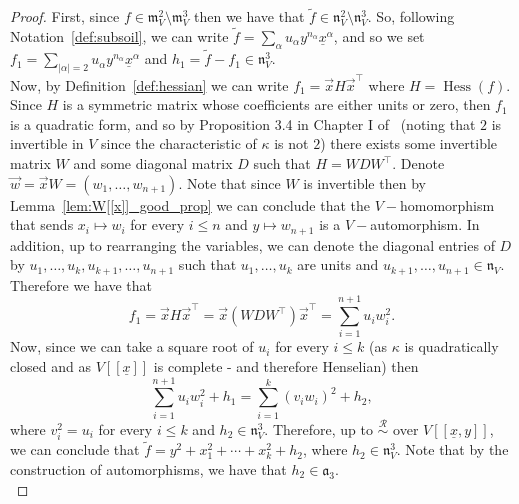 \documentclass{article}
\DeclareMathOperator{\Hess}{Hess}
\newcommand{\equivr}{\overset{\mathcal{R}}{\sim}}
\newcommand{\maxV}{\mathfrak{m}_V}
\newcommand{\naxV}{\mathfrak{n}_V}
\numberwithin{theorem}{section}
\begin{document}
\begin{proof}
    First, since $f \in \maxV^2 \setminus \maxV^3$ then we have that $\tilde{f} \in \naxV^2 \setminus \naxV^3$. So, following Notation~\ref{def:subsoil}, we can write $\tilde{f}=\sum_{\alpha} u_{\alpha} y^{n_{\alpha}} \underline{x}^{\alpha}$, and so we set $f_1=\sum_{|\alpha|=2} u_{\alpha} y^{n_{\alpha}} \underline{x}^{\alpha}$ and $h_1=\tilde{f}-f_1 \in \naxV^3$. \\

    
    Now, by Definition~\ref{def:hessian} we can write $f_1 = \vec{x} H \vec{x}^\intercal$ where $H=\Hess (f)$. Since $H$ is a symmetric matrix whose coefficients are either units or zero, then $f_1$ is a quadratic form, and so by Proposition 3.4 in Chapter I of~\cite{baeza2006quadratic} (noting that $2$ is invertible in $V$ since the characteristic of $\kappa$ is not $2$) there exists some invertible matrix $W$ and some diagonal matrix $D$ such that $H = W D W^\intercal$. Denote $\vec{w}=\vec{x}W=(w_1, \dots, w_{n+1})$. Note that since $W$ is invertible then by Lemma~\ref{lem:W[[x]]_good_prop} we can conclude that the $V-$homomorphism that sends $x_i \mapsto w_i$ for every $i \leq n$ and $y \mapsto w_{n+1}$ is a $V-$automorphism. In addition, up to rearranging the variables, we can denote the diagonal entries of $D$ by $u_1, \dots, u_k, u_{k+1}, \dots, u_{n+1}$ such that $u_1, \dots, u_k$ are units and $u_{k+1}, \dots, u_{n+1} \in \naxV$. Therefore we have that
    \begin{equation*}
        f_1 = \vec{x} H \vec{x}^\intercal = \vec{x} (W D W^\intercal) \vec{x}^\intercal = \sum_{i=1}^{n+1} u_i w_i^2.   
    \end{equation*}
    \noindent Now, since we can take a square root of $u_i$ for every $i \leq k$ (as $\kappa$ is quadratically closed and as $V[[\underline{x}]]$ is complete - and therefore Henselian) then
    \begin{equation*}
        \sum_{i=1}^{n+1} u_iw_i^2 + h_1 = \sum_{i=1}^{k} (v_iw_i)^2 + h_2,
    \end{equation*}
    where $v_i^2=u_i$ for every $i \leq k$ and $h_2 \in \naxV^3$. Therefore, up to $\equivr$ over $V[[\underline{x},y]]$, we can conclude that $\tilde{f} =  y^2 +  x_1^2 +\cdots  + x_k^2 + h_2$, where $h_2 \in \naxV^3$. Note that by the construction of automorphisms, we have that $h_2 \in \mathfrak{a}_3$. \\
    

\end{proof}
\end{document}
